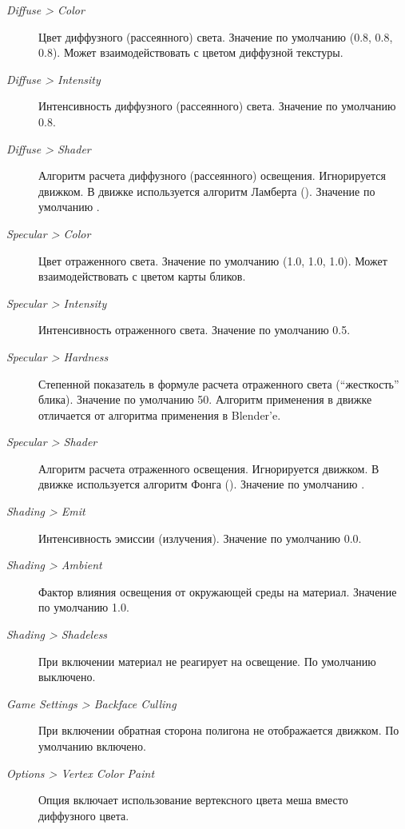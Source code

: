 \documentclass[a4paper,12pt,oneside]{sphinxmanual}
\begin{document}
\begin{description}
\item[{\emph{Diffuse \textgreater{} Color}}] \leavevmode
Цвет диффузного (рассеянного) света. Значение по умолчанию (0.8, 0.8, 0.8). Может взаимодействовать с цветом диффузной текстуры.

\item[{\emph{Diffuse \textgreater{} Intensity}}] \leavevmode
Интенсивность диффузного (рассеянного) света. Значение по умолчанию 0.8.

\item[{\emph{Diffuse \textgreater{} Shader}}] \leavevmode
Алгоритм расчета диффузного (рассеянного) освещения. Игнорируется движком. В движке используется алгоритм Ламберта (). Значение по умолчанию .

\item[{\emph{Specular \textgreater{} Color}}] \leavevmode
Цвет отраженного света. Значение по умолчанию (1.0, 1.0, 1.0). Может взаимодействовать с цветом карты бликов.

\item[{\emph{Specular \textgreater{} Intensity}}] \leavevmode
Интенсивность отраженного света. Значение по умолчанию 0.5.

\item[{\emph{Specular \textgreater{} Hardness}}] \leavevmode
Степенной показатель в формуле расчета отраженного света (``жесткость'' блика). Значение по умолчанию 50. Алгоритм применения в движке отличается от алгоритма применения в Blender'e.

\item[{\emph{Specular \textgreater{} Shader}}] \leavevmode
Алгоритм расчета отраженного освещения. Игнорируется движком. В движке используется алгоритм Фонга (). Значение по умолчанию .

\item[{\emph{Shading \textgreater{} Emit}}] \leavevmode
Интенсивность эмиссии (излучения). Значение по умолчанию 0.0.

\item[{\emph{Shading \textgreater{} Ambient}}] \leavevmode
Фактор влияния освещения от окружающей среды на материал. Значение по умолчанию 1.0.

\item[{\emph{Shading \textgreater{} Shadeless}}] \leavevmode
При включении материал не реагирует на освещение. По умолчанию выключено.

\item[{\emph{Game Settings \textgreater{} Backface Culling}}] \leavevmode
При включении обратная сторона полигона не отображается движком. По умолчанию включено.

\item[{\emph{Options \textgreater{} Vertex Color Paint}}] \leavevmode
Опция включает использование вертексного цвета меша вместо диффузного цвета.

\end{description}
\end{document}
